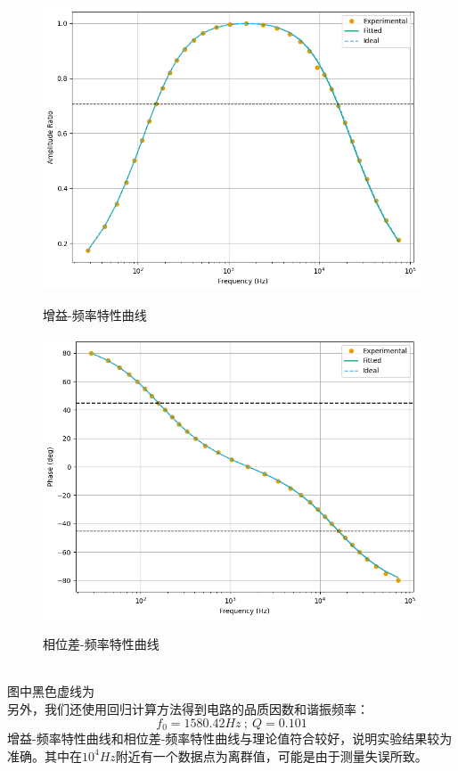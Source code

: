\documentclass[UTF8]{ctexart}
\begin{document}
\begin{figure}[htbp]
        \centering
    \begin{minipage}[t]{0.48\textwidth}
        \centering
        \includegraphics[width=\textwidth]{gain.png}
        \caption{增益-频率特性曲线}\label{fig:gain}
        \label{fig:gain}
    \end{minipage}
    \begin{minipage}[t]{0.48\textwidth}
        \centering
        \includegraphics[width=\textwidth]{phase.png}
        \caption{相位差-频率特性曲线}\label{fig:phase}
        \label{fig:phase}
    \end{minipage}
\end{figure}
\\
图中黑色虚线为
\\
另外，我们还使用回归计算方法得到电路的品质因数和谐振频率：
$$ f_0=1580.42 Hz\ ;\ Q =0.101$$
增益-频率特性曲线和相位差-频率特性曲线与理论值符合较好，说明实验结果较为准确。其中在$10^4 Hz$附近有一个数据点为离群值，可能是由于测量失误所致。
\end{document}

